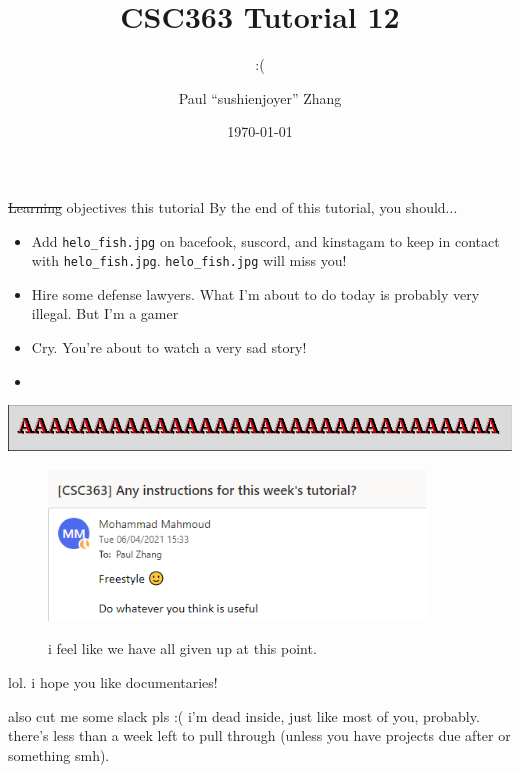 \documentclass{beamer}
\title{CSC363 Tutorial 12}
\subtitle{:(}
\date{\today}
\author{Paul ``sushi{\textunderscore}enjoyer'' Zhang}
\institute{Chungus stole the precious thing.}
\begin{document}
\maketitle

\begin{frame}{\sout{Learning} objectives this tutorial}
By the end of this tutorial, you should...
\begin{itemize}
\item Add \texttt{helo\_fish.jpg} on bacefook, suscord, and kinstagam to keep in contact with \texttt{helo\_fish.jpg}. \texttt{helo\_fish.jpg} will miss you!
\item Hire some defense lawyers. What I'm about to do today is probably very illegal. But I'm a gamer \emojisunglasses
\item Cry. You're about to watch a very sad story! 
\item 
\end{itemize}
\end{frame}

\begin{frame}{\includegraphics{img/a.png}}
\begin{figure}[h]
\centering
\includegraphics[width=10cm]{img/helpme.png}

i feel like we have all given up at this point.
\end{figure}

lol. i hope you like documentaries!

\vspace{2mm}

{\tiny also cut me some slack pls :( i'm dead inside, just like most of you, probably. there's less than a week left to pull through (unless you have projects due after or something smh). } 
\end{frame}
\end{document}
